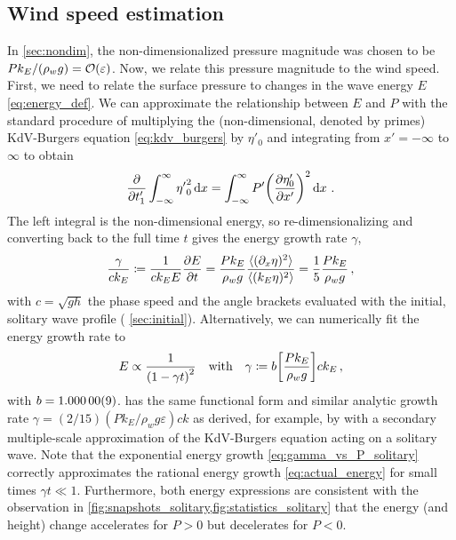 \documentclass{jfm}
\renewcommand*{\epsilon}{\varepsilon}
\begin{document}
\subsection{\label{sec:press_mag} Wind speed estimation}
In \cref{sec:nondim}, the non-dimensionalized pressure magnitude was
chosen to be $P k_E/(\rho_w g) = \order{\epsilon}$.
Now, we relate this pressure magnitude to the wind speed.
First, we need to relate the surface pressure to changes in the wave
energy $E$ \cref{eq:energy_def}.
We can approximate the relationship between $E$ and $P$ with the
standard procedure \citep[\eg][]{mei2005nonlinear} of multiplying the
(non-dimensional, denoted by primes) KdV-Burgers equation
\cref{eq:kdv_burgers} by $\eta'_0$ and integrating from $x'=-\infty$ to
$\infty$ to obtain
\begin{equation}
  \pdv{t'_1} \int_{-\infty}^{\infty} {\eta'}_0^2 \dd{x}
  = \int_{-\infty}^{\infty} P' \pqty{\pdv{\eta'_0}{x'}}^2
  \dd{x} \,.
\end{equation}
The left integral is the non-dimensional energy, so re-dimensionalizing
and converting back to the full time $t$ gives the energy growth rate
$\gamma$,
\begin{equation}
  \frac{\gamma}{c k_E} \coloneqq
  \frac{1}{c k_E E} \pdv{E}{t}
  = \frac{P k_E}{\rho_w g} \frac{\langle (\partial_x \eta)^2 \rangle}
    {\langle (k_E \eta)^2 \rangle}
  = \frac{1}{5} \frac{P k_E}{\rho_w g}
  \,,
  \label{eq:gamma_vs_P_solitary}
\end{equation}
with $c = \sqrt{gh}$ the phase speed and the angle brackets evaluated
with the initial, solitary wave profile (\cf{} \cref{sec:initial}).
Alternatively, we can numerically fit the energy growth rate to
\begin{equation}
  E \propto \frac{1}{\pqty{1 - \gamma t}^2}
  \qq{with}
  \gamma \coloneqq b \bqty{\frac{P k_E}{\rho_w g}} c k_E
  \,,
  \label{eq:actual_energy}
\end{equation}
with $b = \num{1.00000 \pm 0.00009}$.
 has the same functional form and similar
analytic growth rate $\gamma = (2/15) (P k_E/\rho_w g \epsilon) ck$ as
derived, for example, by \citet{zdyrski2019effects} with a secondary
multiple-scale approximation of the KdV-Burgers equation acting on a
solitary wave.
Note that the exponential energy growth \cref{eq:gamma_vs_P_solitary}
correctly approximates the rational energy growth
\cref{eq:actual_energy} for small times $\gamma t \ll 1$.
Furthermore, both energy expressions are consistent with the observation
in \cref{fig:snapshots_solitary,fig:statistics_solitary} that the energy
(and height) change accelerates for $P>0$ but decelerates for $P<0$.
\end{document}
